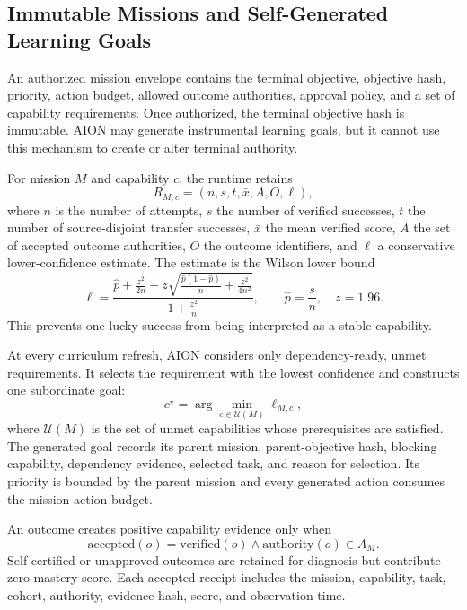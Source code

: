 \subsection{Immutable Missions and Self-Generated Learning Goals}

An authorized mission envelope contains the terminal objective, objective hash,
priority, action budget, allowed outcome authorities, approval policy, and a set
of capability requirements.  Once authorized, the terminal objective hash is
immutable.  AION may generate instrumental learning goals, but it cannot use
this mechanism to create or alter terminal authority.

For mission $M$ and capability $c$, the runtime retains
\begin{equation}
R_{M,c}=\left(n,s,t,\bar{x},A,O,\ell\right),
\end{equation}
where $n$ is the number of attempts, $s$ the number of verified successes, $t$
the number of source-disjoint transfer successes, $\bar{x}$ the mean verified
score, $A$ the set of accepted outcome authorities, $O$ the outcome identifiers,
and $\ell$ a conservative lower-confidence estimate.  The estimate is the
Wilson lower bound
\begin{equation}
\ell=\frac{
\hat{p}+\frac{z^2}{2n}
-z\sqrt{\frac{\hat{p}(1-\hat{p})}{n}+\frac{z^2}{4n^2}}
}{1+\frac{z^2}{n}},
\qquad \hat{p}=\frac{s}{n},\quad z=1.96.
\label{eq:wilson-mastery}
\end{equation}
This prevents one lucky success from being interpreted as a stable capability.

At every curriculum refresh, AION considers only dependency-ready, unmet
requirements.  It selects the requirement with the lowest confidence and
constructs one subordinate goal:
\begin{equation}
c^{\star}=\arg\min_{c\in\mathcal{U}(M)} \ell_{M,c},
\end{equation}
where $\mathcal{U}(M)$ is the set of unmet capabilities whose prerequisites are
satisfied.  The generated goal records its parent mission, parent-objective
hash, blocking capability, dependency evidence, selected task, and reason for
selection.  Its priority is bounded by the parent mission and every generated
action consumes the mission action budget.

An outcome creates positive capability evidence only when
\begin{equation}
\text{accepted}(o)=
\text{verified}(o)
\land \text{authority}(o)\in A_M.
\label{eq:outcome-authority}
\end{equation}
Self-certified or unapproved outcomes are retained for diagnosis but contribute
zero mastery score.  Each accepted receipt includes the mission, capability,
task, cohort, authority, evidence hash, score, and observation time.

